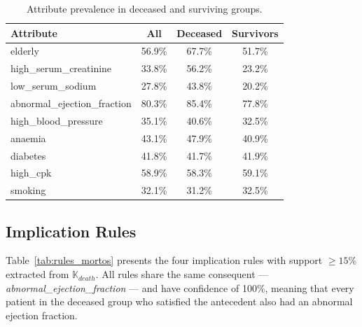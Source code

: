 \documentclass[a4paper,twoside]{article}
\begin{document}
\begin{table}[h]
\caption{Attribute prevalence in deceased and surviving groups.}
\label{tab:prevalence}
\centering
\small
\begin{tabular}{|l|c|c|c|}
\hline
\textbf{Attribute} & \textbf{All} & \textbf{Deceased} & \textbf{Survivors} \\
\hline
elderly                       & 56.9\% & 67.7\% & 51.7\% \\
high\_serum\_creatinine        & 33.8\% & 56.2\% & 23.2\% \\
low\_serum\_sodium             & 27.8\% & 43.8\% & 20.2\% \\
abnormal\_ejection\_fraction   & 80.3\% & 85.4\% & 77.8\% \\
high\_blood\_pressure          & 35.1\% & 40.6\% & 32.5\% \\
anaemia                       & 43.1\% & 47.9\% & 40.9\% \\
diabetes                      & 41.8\% & 41.7\% & 41.9\% \\
high\_cpk                     & 58.9\% & 58.3\% & 59.1\% \\
smoking                       & 32.1\% & 31.2\% & 32.5\% \\
\hline
\end{tabular}
\end{table}

\subsection{Implication Rules}

Table~\ref{tab:rules_mortos} presents the four implication rules with support $\geq 15\%$ extracted from $\mathbb{K}_{death}$. All rules share the same consequent — \textit{abnormal\_ejection\_fraction} — and have confidence of 100\%, meaning that every patient in the deceased group who satisfied the antecedent also had an abnormal ejection fraction.
\end{document}
